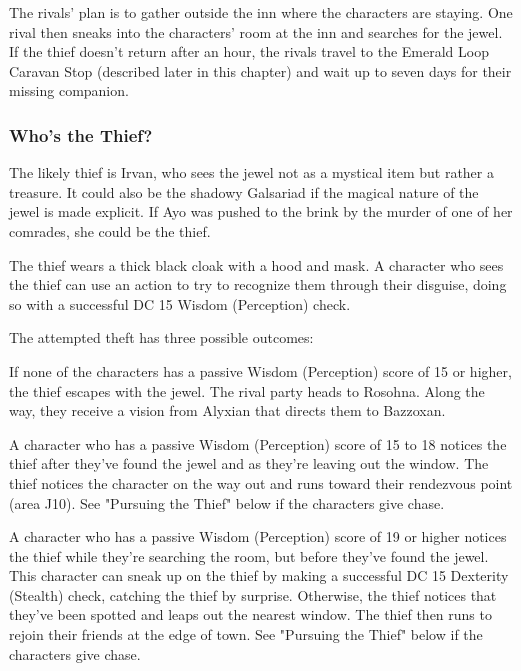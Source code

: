 \documentclass[10pt,a4paper,twoside,bg=print,twocolumn,openany,nodeprecatedcode]{dndbook}
\begin{document}
The rivals' plan is to gather outside the inn where the characters are staying. One rival then sneaks into the characters' room at the inn and searches for the jewel. If the thief doesn't return after an hour, the rivals travel to the Emerald Loop Caravan Stop (described later in this chapter) and wait up to seven days for their missing companion.

\subsubsection{Who's the Thief?}
The likely thief is Irvan, who sees the jewel not as a mystical item but rather a treasure. It could also be the shadowy Galsariad if the magical nature of the jewel is made explicit. If Ayo was pushed to the brink by the murder of one of her comrades, she could be the thief.

The thief wears a thick black cloak with a hood and mask. A character who sees the thief can use an action to try to recognize them through their disguise, doing so with a successful DC 15 Wisdom (Perception) check.

The attempted theft has three possible outcomes:


\begin{description}[nolistsep]
\item[Caught Sleeping.]
If none of the characters has a passive Wisdom (Perception) score of 15 or higher, the thief escapes with the jewel. The rival party heads to Rosohna. Along the way, they receive a vision from Alyxian that directs them to Bazzoxan.
\item[Slow to Act.]
A character who has a passive Wisdom (Perception) score of 15 to 18 notices the thief after they've found the jewel and as they're leaving out the window. The thief notices the character on the way out and runs toward their rendezvous point (area J10). See "Pursuing the Thief" below if the characters give chase.
\item[Quick to Act.]
A character who has a passive Wisdom (Perception) score of 19 or higher notices the thief while they're searching the room, but before they've found the jewel. This character can sneak up on the thief by making a successful DC 15 Dexterity (Stealth) check, catching the thief by surprise. Otherwise, the thief notices that they've been spotted and leaps out the nearest window. The thief then runs to rejoin their friends at the edge of town. See "Pursuing the Thief" below if the characters give chase.
\end{description}
\end{document}
